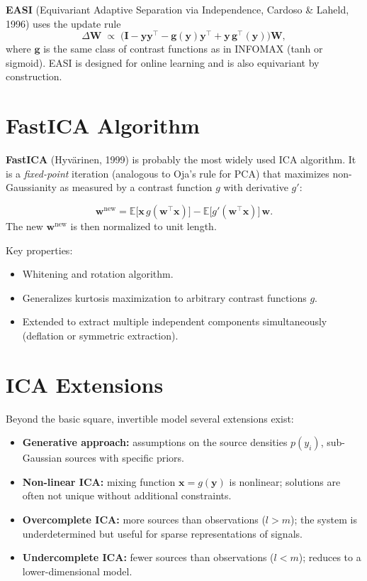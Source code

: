\documentclass[11pt, oneside]{book}
\newcommand{\E}{\mathbb{E}}
\newcommand{\T}{^{\top}}
\begin{document}
\textbf{EASI} (Equivariant Adaptive Separation via Independence, Cardoso \& Laheld, 1996)
uses the update rule
\[
  \Delta\bm{W} \;\propto\; \bigl(\bm{I} - \bm{y}\bm{y}\T - \bm{g}(\bm{y})\bm{y}\T
  + \bm{y}\,\bm{g}\T(\bm{y})\bigr)\bm{W},
\]
where $\bm{g}$ is the same class of contrast functions as in INFOMAX (tanh or sigmoid).
EASI is designed for online learning and is also equivariant by construction.


\section{FastICA Algorithm}

\textbf{FastICA} (Hyvärinen, 1999) is probably the most widely used ICA algorithm.
It is a \emph{fixed-point} iteration (analogous to Oja's rule for PCA) that maximizes
non-Gaussianity as measured by a contrast function $g$ with derivative $g'$:

\begin{thmbox}[title={FastICA Update}]
\[
  \bm{w}^{\mathrm{new}} = \E\bigl[\bm{x}\,g(\bm{w}\T\bm{x})\bigr]
  - \E\bigl[g'(\bm{w}\T\bm{x})\bigr]\,\bm{w}.
\]
The new $\bm{w}^{\mathrm{new}}$ is then normalized to unit length.
\end{thmbox}

Key properties:
\begin{itemize}
  \item Whitening and rotation algorithm.
  \item Generalizes kurtosis maximization to arbitrary contrast functions $g$.
  \item Extended to extract multiple independent components simultaneously
        (deflation or symmetric extraction).
\end{itemize}


\section{ICA Extensions}

Beyond the basic square, invertible model several extensions exist:
\begin{itemize}
  \item \textbf{Generative approach:} assumptions on the source densities $p(y_i)$,
        sub-Gaussian sources with specific priors.
  \item \textbf{Non-linear ICA:} mixing function $\bm{x} = g(\bm{y})$ is nonlinear;
        solutions are often not unique without additional constraints.
  \item \textbf{Overcomplete ICA:} more sources than observations ($l > m$); the system
        is underdetermined but useful for sparse representations of signals.
  \item \textbf{Undercomplete ICA:} fewer sources than observations ($l < m$); reduces
        to a lower-dimensional model.
\end{itemize}
\end{document}
